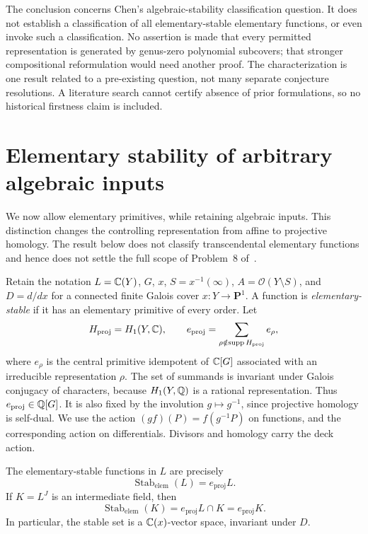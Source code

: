 The conclusion concerns Chen's algebraic-stability classification question.
It does not establish a classification of all elementary-stable elementary
functions, or even invoke such a classification. No assertion is made that
every permitted representation is generated by genus-zero polynomial
subcovers; that stronger compositional reformulation would need another proof.
The characterization is one result related to a pre-existing question, not
many separate conjecture resolutions. A literature search cannot certify
absence of prior formulations, so no historical firstness claim is included.


\section{Elementary stability of arbitrary algebraic inputs}
\label{sec:elementary-monodromy}

We now allow elementary primitives, while retaining algebraic inputs.  This
distinction changes the controlling representation from affine to projective
homology.  The result below does not classify transcendental elementary
functions and hence does not settle the full scope of Problem~8
of~\cite{CK2016}.

Retain the notation $L=\mathbb C(Y)$, $G$, $x$, $S=x^{-1}(\infty)$,
$A=\mathcal O(Y\setminus S)$, and $D=d/dx$ for a connected finite Galois
cover $x:Y\to\mathbf P^1$.  A function is \emph{elementary-stable} if it has
an elementary primitive of every order.  Let
\[
 H_{\mathrm{proj}}=H_1(Y,\mathbb C),\qquad
 e_{\mathrm{proj}}
   =\sum_{\rho\notin\operatorname{supp}H_{\mathrm{proj}}}e_\rho,
\]
where $e_\rho$ is the central primitive idempotent of $\mathbb C[G]$ associated
with an irreducible representation $\rho$.  The set of summands is invariant
under Galois conjugacy of characters, because $H_1(Y,\mathbb Q)$ is a rational
representation.  Thus $e_{\mathrm{proj}}\in\mathbb Q[G]$.  It is also fixed by
the involution $g\mapsto g^{-1}$, since projective homology is self-dual.
We use the action $(g f)(P)=f(g^{-1}P)$ on functions, and the corresponding
action on differentials.  Divisors and homology carry the deck action.

\begin{theorem}
\label{thm:elementary-projective}
The elementary-stable functions in $L$ are precisely
\[
 \operatorname{Stab}_{\mathrm{elem}}(L)=e_{\mathrm{proj}}L.
\]
If $K=L^J$ is an intermediate field, then
\[
 \operatorname{Stab}_{\mathrm{elem}}(K)
   =e_{\mathrm{proj}}L\cap K=e_{\mathrm{proj}}K.
\]
In particular, the stable set is a $\mathbb C(x)$-vector space, invariant under $D$.
\end{theorem}

